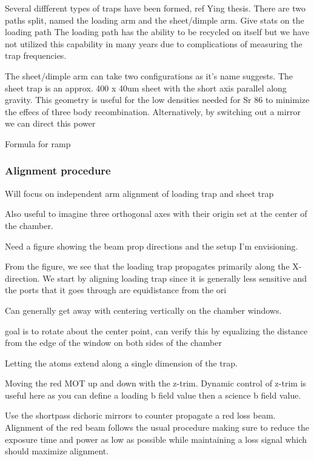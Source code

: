 Several diffferent types of traps have been formed, ref Ying thesis. There are two paths split, named the loading arm and the sheet/dimple arm. Give stats on the loading path The loading path has the ability to be recycled on itself but we have not utilized this capability in many years due to complications of measuring the trap frequencies. 

The sheet/dimple arm can take two configurations as it's name suggests. The sheet trap is an approx. 400 x 40um sheet with the short axis parallel along gravity. This geometry is useful for the low densities needed for Sr 86 to minimize the effecs of three body recombination. Alternatively, by switching out a mirror we can direct this power

Formula for ramp

\subsubsection{Alignment procedure} \label{sssec:1064_align}

Will focus on independent arm alignment of loading trap and sheet trap

Also useful to imagine three orthogonal axes with their origin set at the center of the chamber.

Need a figure showing the beam prop directions and the setup I'm envisioning.


From the figure, we see that the loading trap propagates primarily along the X-direction. We start by aligning loading trap since it is generally less sensitive and the ports that it goes through are equidistance from the ori

Can generally get away with centering vertically on the chamber windows. 

goal is to rotate about the center point, can verify this by equalizing the distance from the edge of the window on both sides of the chamber

Letting the atoms extend along a single dimension of the trap. 

Moving the red MOT up and down with the z-trim. Dynamic control of z-trim is useful here as you can define a loading b field value then a science b field value.

Use the shortpass dichoric mirrors to counter propagate a red loss beam. Alignment of the red beam follows the usual procedure making sure to reduce the exposure time and power as low as possible while maintaining a loss signal which should maximize alignment.

